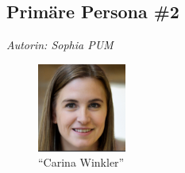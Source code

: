 \documentclass[12pt,paper=a4,oneside,hidelinks,headings=small,captions=heading,captions=nooneline]{scrartcl}
\begin{document}
\subsection{Primäre Persona \#2}
\label{sec:orgbb46d01}

\emph{Autorin: Sophia PUM}

\begin{figure}[htbp]
\centering
\includegraphics[width=110px]{./img/m1_persona_2_rational.png}
\caption{\label{fig:persona2}"`Carina Winkler"'}
\end{figure}
\end{document}
